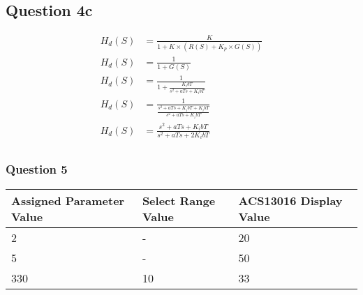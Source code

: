 \documentclass{article}
\begin{document}
\subsection*{Question 4c} %
\label{sub:question_4c}
\begin{align*}
    H_d(S) &= \frac{K}{1 + K\times (R(S) + K_p \times G(S))}\\
    H_d(S) &= \frac{1}{1 + G(S)}\\
    H_d(S) &= \frac{1}{1 + \frac{K_ibT}{s^2 + aTs + K_ibT}}\\
    H_d(S) &= \frac{1}{\frac{s^2 + aTs + K_ibT + K_ibT}{s^2 + aTs + K_ibT}}\\
    H_d(S) &= \frac{s^2 + aTs + K_ibT}{s^2 + aTs + 2K_ibT}\\
\end{align*}

\subsubsection*{Question 5} %
\label{ssub:question_5}
\begin{tabular}{|l|l|l|}
    \hline
    \textbf{Assigned Parameter Value} & \textbf{Select Range Value} & \textbf{ACS13016 Display Value}\\
    \hline
    2 & - & 20 \\
    \hline
    5 & - & 50 \\
    \hline
    330 & 10 & 33\\
    \hline
\end{tabular}

\end{document}
